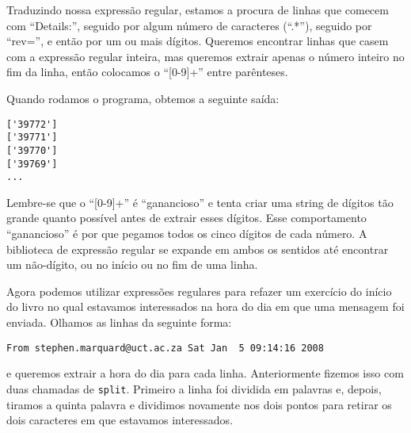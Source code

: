 Traduzindo nossa expressão regular, estamos a procura de linhas que comecem com ``Details:'',
seguido por algum número de caracteres (``.*''), seguido por ``rev='', e então por um ou mais 
dígitos. Queremos encontrar linhas que casem com a expressão regular inteira, mas queremos 
extrair apenas o número inteiro no fim da linha, então colocamos o ``[0-9]+'' entre parênteses.

Quando rodamos o programa, obtemos a seguinte saída:

\beforeverb
\begin{verbatim}
['39772']
['39771']
['39770']
['39769']
...
\end{verbatim}
\afterverb
%

Lembre-se que o ``[0-9]+'' é ``ganancioso'' e tenta criar uma string de dígitos tão grande quanto 
possível antes de extrair esses dígitos. Esse comportamento ``ganancioso'' é por que pegamos todos 
os cinco dígitos de cada número. A biblioteca de expressão regular se expande em ambos os sentidos 
até encontrar um não-dígito, ou no início ou no fim de uma linha.

Agora podemos utilizar expressões regulares para refazer um exercício do início do livro no qual 
estavamos interessados na hora do dia em que uma mensagem foi enviada. Olhamos as linhas da 
seguinte forma: 

\beforeverb
\begin{verbatim}
From stephen.marquard@uct.ac.za Sat Jan  5 09:14:16 2008
\end{verbatim}
\afterverb
%

e queremos extrair a hora do dia para cada linha. Anteriormente fizemos isso com duas chamadas de
{\tt split}. Primeiro a linha foi dividida em palavras e, depois, tiramos a quinta palavra e dividimos 
novamente nos dois pontos para retirar os dois caracteres em que estavamos interessados.

